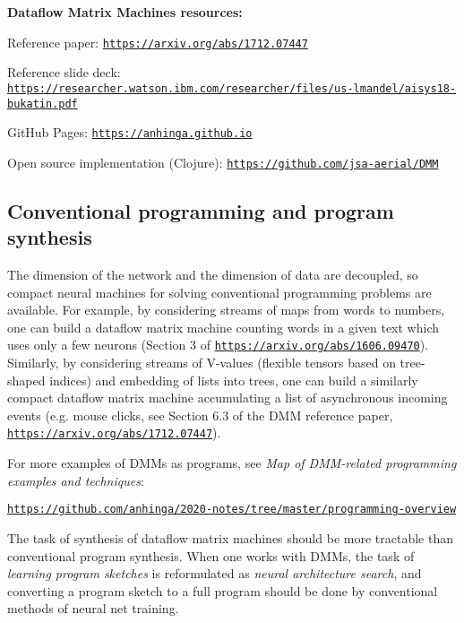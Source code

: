 \documentclass{article}
\begin{document}
\vspace{0.1in}
\noindent
{\bf Dataflow Matrix Machines resources:}

Reference paper: \href{https://arxiv.org/abs/1712.07447}{\tt https://arxiv.org/abs/1712.07447}

Reference slide deck: \href{https://researcher.watson.ibm.com/researcher/files/us-lmandel/aisys18-bukatin.pdf}{\footnotesize\tt https://researcher.watson.ibm.com/researcher/files/us-lmandel/aisys18-bukatin.pdf}

GitHub Pages: \href{https://anhinga.github.io/}{\tt https://anhinga.github.io}

Open source implementation (Clojure): \href{https://github.com/jsa-aerial/DMM}{\tt https://github.com/jsa-aerial/DMM}

\subsection{Conventional programming and program synthesis} The dimension of the network and the dimension
of data are decoupled, so compact neural machines for solving conventional programming problems are available.
For example, by considering streams of maps from words to numbers, one can build a dataflow matrix machine
counting words in a given text which uses only a few neurons 
(Section 3 of \href{https://arxiv.org/abs/1606.09470}{\tt https://arxiv.org/abs/1606.09470}).
Similarly, by considering streams of V-values  (flexible tensors based on tree-shaped indices) and embedding
of lists into trees, one can build a similarly compact dataflow matrix machine
accumulating a list of asynchronous incoming events
(e.g. mouse clicks, see Section 6.3 of the DMM reference paper, \href{https://arxiv.org/abs/1712.07447}{\tt https://arxiv.org/abs/1712.07447}). 

For more examples of DMMs as programs, see {\em Map of DMM-related programming examples and techniques}: 

\hspace{0.3in}\href{https://github.com/anhinga/2020-notes/tree/master/programming-overview}{\tt https://github.com/anhinga/2020-notes/tree/master/programming-overview}

\vspace{0.1in}

The task of synthesis of dataflow matrix machines
should be more tractable than conventional program synthesis. When one works with DMMs, the task of
{\em learning program sketches} is reformulated as {\em neural architecture search},
and converting a program sketch to a full program should be done by
conventional methods of neural net training. 
\end{document}
